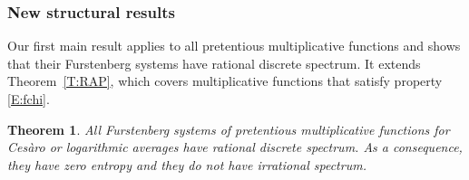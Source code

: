 \documentclass[11pt]{amsart}
\newtheorem{theorem}[lemma]{Theorem}
\theoremstyle{definition}
\newcommand{\E}{{\mathbb E}}
\newcommand{\N}{{\mathbb N}}
\newcommand{\U}{{\mathbb U}}
\begin{document}
 \subsubsection{New structural results}\label{SSS:StructurePretentious}
 Our first main result
 applies to all pretentious multiplicative functions and shows that their Furstenberg systems have rational discrete spectrum. It extends Theorem~\ref{T:RAP}, which covers
 multiplicative functions that  satisfy property \eqref{E:fchi}.
  \begin{theorem}\label{T:StructurePretentious}
 All Furstenberg systems of pretentious  multiplicative functions for  Ces\`aro  or logarithmic averages have rational
 	discrete spectrum. As a consequence, they have  zero entropy and they do not have irrational spectrum.
 \end{theorem}
\end{document}
